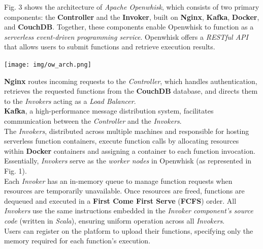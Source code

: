 Fig. 3 shows the architecture of \textit{Apache Openwhisk}, which consists of two primary components: the \textbf{Controller} and the \textbf{Invoker}, built on \textbf{Nginx}, \textbf{Kafka}, \textbf{Docker}, and \textbf{CouchDB}. Together, these components enable Openwhisk to function as a \textit{serverless event-driven programming service}. Openwhisk offers a \textit{RESTful API} that allows users to submit functions and retrieve execution results.\vspace{10pt}
\begin{center}
    \texttt{[image: img/ow\_arch.png]}
    \vspace{10pt}
\end{center}
\textbf{Nginx} routes incoming requests to the \textit{Controller}, which handles authentication, retrieves the requested functions from the \textbf{CouchDB} database, and directs them to the \textit{Invokers} acting as a \textit{Load Balancer}.\vspace{14pt}\\
\textbf{Kafka}, a high-performance message distribution system, facilitates communication between the \textit{Controller} and the \textit{Invokers}.\vspace{14pt}\\
The \textit{Invokers}, distributed across multiple machines and responsible for hosting serverless function containers, execute function calls by allocating resources within \textbf{Docker} containers and assigning a container to each function invocation. Essentially, \textit{Invokers} serve as the \textit{worker nodes} in Openwhisk (as represented in Fig. 1).\vspace{14pt}\\
Each \textit{Invoker} has an in-memory queue to manage function requests when resources are temporarily unavailable. Once resources are freed, functions are dequeued and executed in a \textbf{First Come First Serve} (\textbf{FCFS}) order. All \textit{Invokers} use the same instructions embedded in the \textit{Invoker component's source code} (written in \textit{Scala}), ensuring uniform operation across all \textit{Invokers}.\vspace{14pt}\\
Users can register on the platform to upload their functions, specifying only the memory required for each function's execution.\cite{banaei2022etas}\vspace{14pt}\\
